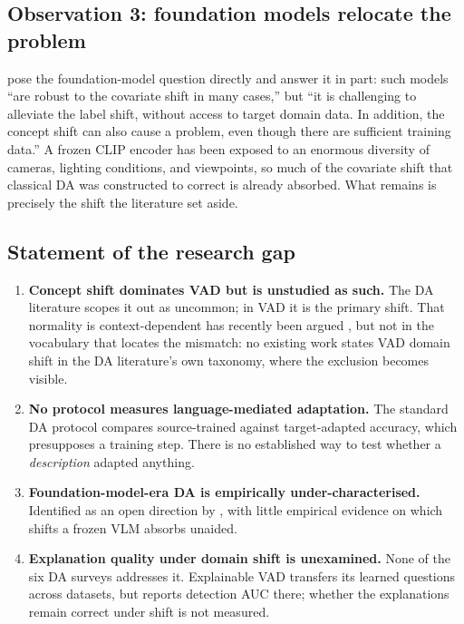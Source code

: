 \documentclass[a4paper,fleqn]{cas-sc}
\begin{document}
\subsection{Observation 3: foundation models relocate the problem}
\citet{liu2022deep} pose the foundation-model question directly and answer it in
part: such models ``are robust to the covariate shift in many cases,'' but ``it
is challenging to alleviate the label shift, without access to target domain
data. In addition, the concept shift can also cause a problem, even though there
are sufficient training data.'' A frozen CLIP encoder has been exposed to an
enormous diversity of cameras, lighting conditions, and viewpoints, so much of
the covariate shift that classical DA was constructed to correct is already
absorbed. What remains is precisely the shift the literature set aside.

\subsection{Statement of the research gap}
\begin{enumerate}[G1.]
  \item \textbf{Concept shift dominates VAD but is unstudied as such.} The DA
        literature scopes it out as uncommon; in VAD it is the primary shift.
        That normality is context-dependent has recently been argued
        \citep{wilkinghoff2026context}, but not in the vocabulary that locates
        the mismatch: no existing work states VAD domain shift in the DA
        literature's own taxonomy, where the exclusion becomes visible.
  \item \textbf{No protocol measures language-mediated adaptation.} The standard
        DA protocol compares source-trained against target-adapted accuracy,
        which presupposes a training step. There is no established way to test
        whether a \emph{description} adapted anything.
  \item \textbf{Foundation-model-era DA is empirically under-characterised.}
        Identified as an open direction by \citet{liu2022deep}, with little
        empirical evidence on which shifts a frozen VLM absorbs unaided.
  \item \textbf{Explanation quality under domain shift is unexamined.} None of
        the six DA surveys addresses it. Explainable VAD \citep{ye2025vera}
        transfers its learned questions across datasets, but reports detection
        AUC there; whether the explanations remain correct under shift is not
        measured.
\end{enumerate}
\end{document}
